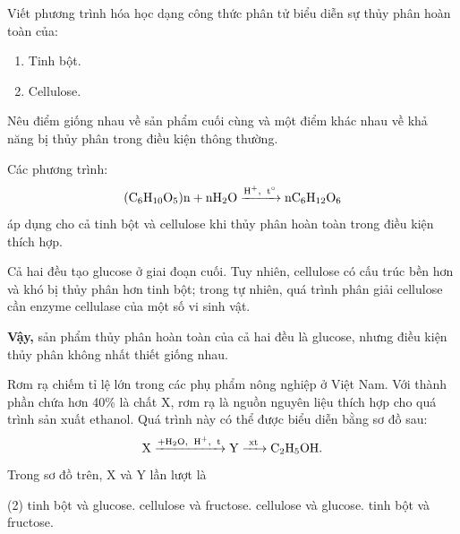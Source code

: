 \begin{tuluyen}
Viết phương trình hóa học dạng công thức phân tử biểu diễn sự thủy phân hoàn toàn của:
\begin{enumerate}
\item Tinh bột.
\item Cellulose.
\end{enumerate}
Nêu điểm giống nhau về sản phẩm cuối cùng và một điểm khác nhau về khả năng bị thủy phân trong điều kiện thông thường.
\begin{loigiaiBT}
Các phương trình:
\[
\ce{(C6H10O5)n + nH2O ->[H^+,\ t^\circ] nC6H12O6}
\]
áp dụng cho cả tinh bột và cellulose khi thủy phân hoàn toàn trong điều kiện thích hợp.

Cả hai đều tạo glucose ở giai đoạn cuối. Tuy nhiên, cellulose có cấu trúc bền hơn và khó bị thủy phân hơn tinh bột; trong tự nhiên, quá trình phân giải cellulose cần enzyme cellulase của một số vi sinh vật.

\textbf{Vậy,} sản phẩm thủy phân hoàn toàn của cả hai đều là glucose, nhưng điều kiện thủy phân không nhất thiết giống nhau.
\end{loigiaiBT}
\end{tuluyen}



\begin{tuluyen}
Rơm rạ chiếm tỉ lệ lớn trong các phụ phẩm nông nghiệp ở Việt Nam. Với thành phần chứa hơn 40\% là chất X, rơm rạ là nguồn nguyên liệu thích hợp cho quá trình sản xuất ethanol. Quá trình này có thể được biểu diễn bằng sơ đồ sau:
\[
\ce{X ->[+H2O,\ H+,\ t] Y ->[xt] C2H5OH}.
\]
Trong sơ đồ trên, X và Y lần lượt là
\begin{tasks}(2)
\task tinh bột và glucose.
\task cellulose và fructose.
\task cellulose và glucose.
\task tinh bột và fructose.
\end{tasks}
\end{tuluyen}

